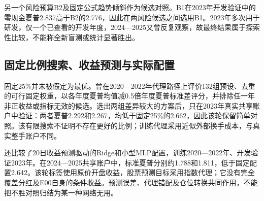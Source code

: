 \documentclass[12pt]{article}
\begin{document}
另一个风险预算B2及固定公式趋势倾斜作为候选对照。B1在2023年开发验证中的零现金夏普2.837高于B2的2.776，因此在两风险候选之间选用B1。2023年多次用于研发，仅一个已查看的开发年度，2024—2025又曾反复观察，故最终结果属于探索性比较，不能称全新盲测或统计显著胜出。
\subsection{固定比例搜索、收益预测与实际配置}
固定25\%并未被假定为最优。曾在2020—2022年代理路径上评价132组预设、去重的可行固定权重，以各年度夏普均值减0.5倍年度夏普标准差评分，并排除任一年非正收益或指标无效的候选。选出两组差异较大的方案后，只在2023年真实共享账户中验证：两者夏普2.292和2.267，均低于固定25\%的2.662，因此该轮保留简单对照。该有限搜索不证明不存在更好的比例；训练代理采用近似外部换手成本，与真实整手账户不同。

还比较了20日收益预测驱动的Ridge和小型MLP配置，训练2020—2022年、开发验证2023年。在2024—2025共享账户中，标准夏普分别约1.788和1.811，低于固定配置2.642。该轮标签使用原价开盘收益，股票预测目标采用指数代理；它没有完全覆盖分红及E00自身的条件收益。预测误差、代理错配及仓位转换共同作用，不能把不胜对照归结为某一种网络无用。
\end{document}
